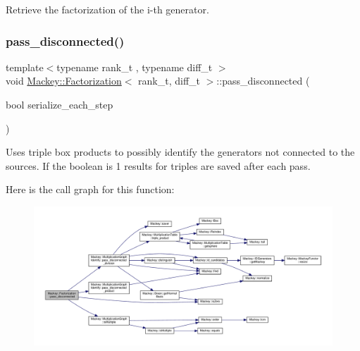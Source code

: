 Retrieve the factorization of the i-\/th generator. 

\mbox{\label{classMackey_1_1Factorization_a93ebe0edcc11f0cd962294b5b21c94aa}} 
\subsubsection{\texorpdfstring{pass\+\_\+disconnected()}{pass\_disconnected()}\hspace{0.1cm}{\footnotesize\ttfamily [1/2]}}
{\footnotesize\ttfamily template$<$typename rank\+\_\+t , typename diff\+\_\+t $>$ \\
void \hyperlink{classMackey_1_1Factorization}{Mackey\+::\+Factorization}$<$ rank\+\_\+t, diff\+\_\+t $>$\+::pass\+\_\+disconnected (\begin{DoxyParamCaption}\item[{bool}]{serialize\+\_\+each\+\_\+step }\end{DoxyParamCaption})}



Uses triple box products to possibly identify the generators not connected to the sources. If the boolean is 1 results for triples are saved after each pass. 

Here is the call graph for this function\+:\nopagebreak
\begin{figure}[H]
\begin{center}
\leavevmode
\includegraphics[width=350pt]{classMackey_1_1Factorization_a93ebe0edcc11f0cd962294b5b21c94aa_cgraph}
\end{center}
\end{figure}
\mbox{\label{classMackey_1_1Factorization_a28a789ea46909c33da8958bc1d17c127}} 
